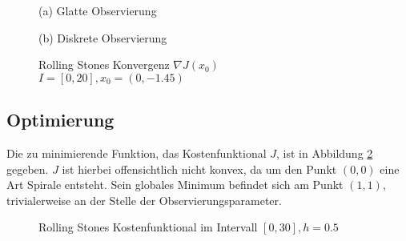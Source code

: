 \begin{figure}[H]
\footnotesize 
\centering
\begin{minipage}[b]{0.49\linewidth}

\caption*{(a) Glatte Observierung}
\end{minipage}
\begin{minipage}[b]{0.49\linewidth}

\caption*{(b) Diskrete Observierung}
\end{minipage}
\caption{Rolling Stones Konvergenz $\nabla J(x_0)$\\ $I=[0,20],x_0=(0,-1.45)$}
\label{fig:rollingStonesAdjoint1}
\end{figure}
% 
% 


\subsection{Optimierung}
Die zu minimierende Funktion, das Kostenfunktional $J$, ist in Abbildung \ref{fig:rolling_costfunctional} gegeben. $J$ ist hierbei offensichtlich nicht konvex, da um den Punkt $(0,0)$ eine Art Spirale entsteht. Sein globales Minimum befindet sich am Punkt $(1,1)$, trivialerweise an der Stelle der Observierungsparameter. 
\begin{figure}[H]
\centering

\caption{Rolling Stones Kostenfunktional im Intervall $[0,30],h=0.5$}
\label{fig:rolling_costfunctional}
\end{figure}

